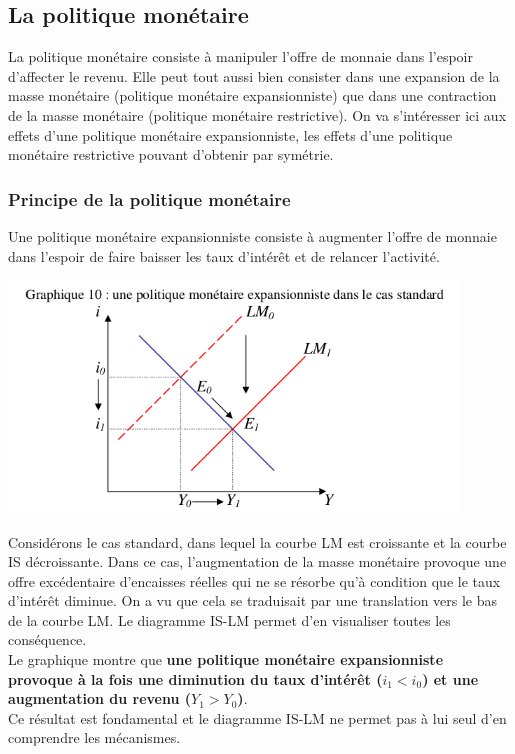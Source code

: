 \documentclass[10pt]{book}
\begin{document}
\subsection{La politique monétaire}
La politique monétaire consiste à manipuler l'offre de monnaie dans l'espoir d'affecter le revenu. Elle peut tout aussi bien consister dans une expansion de la masse monétaire (politique monétaire expansionniste) que dans une contraction de la masse monétaire (politique monétaire restrictive). On va s'intéresser ici aux effets d'une politique monétaire expansionniste, les effets d'une politique monétaire restrictive pouvant d'obtenir par symétrie.
\subsubsection{Principe de la politique monétaire}
Une politique monétaire expansionniste consiste à augmenter l'offre de monnaie dans l'espoir de faire baisser les taux d'intérêt et de relancer l'activité.
\begin{center}
  \includegraphics[width=12cm]{graph33.png}
\end{center}
Considérons le cas standard, dans lequel la courbe LM est croissante et la courbe IS décroissante. Dans ce cas, l'augmentation de la masse monétaire provoque une offre excédentaire d'encaisses réelles qui ne se résorbe qu'à condition que le taux d'intérêt diminue. On a vu que cela se traduisait par une translation vers le bas de la courbe LM. Le diagramme IS-LM permet d'en visualiser toutes les conséquence. \\
Le graphique montre que \textbf{une politique monétaire expansionniste provoque à la fois une diminution du taux d'intérêt ($i_1 < i_0$) et une augmentation du revenu ($Y_1 > Y_0$)}. \\
Ce résultat est fondamental et le diagramme IS-LM ne permet pas à lui seul d'en comprendre les mécanismes. \\
\end{document}
